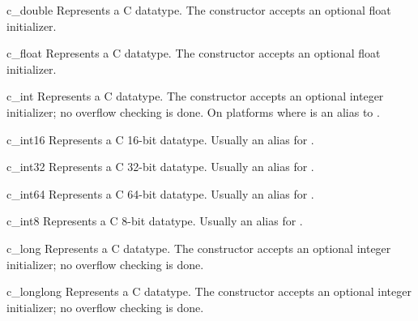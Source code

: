 \begin{classdesc}{c_double}{}
Represents a C  datatype.  The constructor accepts an
optional float initializer.
\end{classdesc}

\begin{classdesc}{c_float}{}
Represents a C  datatype.  The constructor accepts an
optional float initializer.
\end{classdesc}

\begin{classdesc}{c_int}{}
Represents a C  datatype.  The constructor accepts an
optional integer initializer; no overflow checking is done.  On
platforms where   is an
alias to .
\end{classdesc}

\begin{classdesc}{c_int16}{}
Represents a C 16-bit  datatype.  Usually an alias
for .
\end{classdesc}

\begin{classdesc}{c_int32}{}
Represents a C 32-bit  datatype.  Usually an alias
for .
\end{classdesc}

\begin{classdesc}{c_int64}{}
Represents a C 64-bit  datatype.  Usually an alias
for .
\end{classdesc}

\begin{classdesc}{c_int8}{}
Represents a C 8-bit  datatype.  Usually an alias for .
\end{classdesc}

\begin{classdesc}{c_long}{}
Represents a C  datatype.  The constructor accepts
an optional integer initializer; no overflow checking is done.
\end{classdesc}

\begin{classdesc}{c_longlong}{}
Represents a C  datatype.  The constructor
accepts an optional integer initializer; no overflow checking is done.
\end{classdesc}

